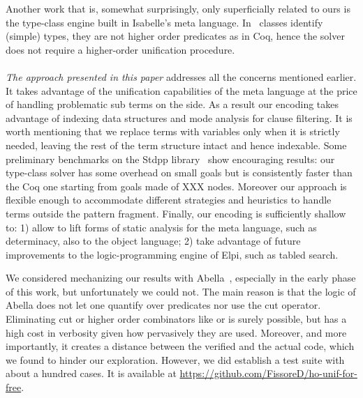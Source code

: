 \documentclass[sigconf,natbib=false,review]{acmart}
\def\githubUrl{\url{https://github.com/FissoreD/ho-unif-for-free}}
\begin{document}
Another work that is, somewhat surprisingly, only superficially related to ours is the
type-class engine built in Isabelle's meta language. In~\cite{wenzel97}
classes identify (simple) types, they are not higher order predicates
as in Coq, hence the solver does not require a higher-order unification
procedure.\\
~\\
\emph{The approach presented in this paper}
addresses all the concerns
mentioned earlier. It takes advantage of the
unification capabilities of the meta language
at the price of handling problematic sub terms on
the side.
As a result %
our encoding takes
advantage of indexing data structures and
mode analysis for clause filtering.
It is worth mentioning that we replace terms with variables only
when it is strictly needed, leaving the rest of the term structure intact
and hence indexable. %
Some preliminary benchmarks on the Stdpp
library~\cite{JUNG_KREBBERS_JOURDAN_BIZJAK_BIRKEDAL_DREYER_2018} show
encouraging results: our type-class solver has some
overhead on small goals but is consistently faster than
the Coq one starting from goals made of XXX nodes.
Moreover our approach is flexible enough to accommodate different strategies
and heuristics to handle terms outside the pattern fragment.
Finally, our encoding is sufficiently shallow to: 1)
allow to lift forms of static analysis for
the meta language, such as determinacy, also to the object
language; 2) take advantage of future improvements to the
logic-programming engine of Elpi, such as tabled search.

We considered mechanizing our results with Abella~\cite{gacek2008abella},
especially in the early phase of this work, but unfortunately we could not.
The main reason is that the logic of Abella does not let one quantify over
predicates nor use the cut operator. Eliminating cut or
higher order
combinators like  or  is surely
possible, but 
has a high cost in verbosity given how pervasively they are used.
Moreover, and more importantly, it creates a distance
between the verified and the actual code, which we found to
hinder our exploration. However, we did establish a
test suite with about a hundred cases.
It is available at \githubUrl.





\printbibliography


% 
\end{document}
